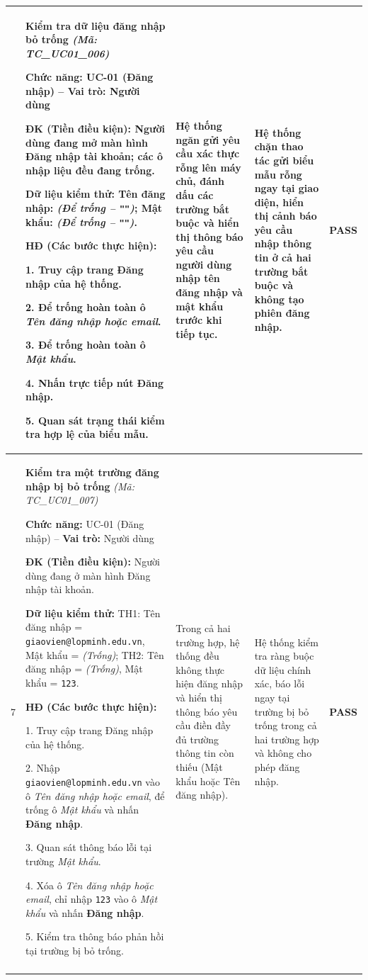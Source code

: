 \documentclass[12pt,a4paper]{report}
\newcommand{\passbadge}{\textbf{\textcolor{passgreen}{PASS}}}
\newcommand{\tcheader}[2]{%
  \textbf{#1} \textit{(Mã: #2)}\par
}
\newcommand{\tcmeta}[2]{%
  \textbf{Chức năng:} #1 -- \textbf{Vai trò:} #2\par
}
\newcommand{\tcpre}[1]{%
  \textbf{ĐK (Tiền điều kiện):} #1\par
}
\newcommand{\tcdata}[1]{%
  \textbf{Dữ liệu kiểm thử:} #1\par
}
\begin{document}
{\begin{longtable}{|C{0.8cm}|L{6.8cm}|L{3.0cm}|L{2.9cm}|C{1.2cm}|}
{%
6 &
\tcheader{Kiểm tra dữ liệu đăng nhập bỏ trống}{TC\_UC01\_006}
\tcmeta{UC-01 (Đăng nhập)}{Người dùng}
\tcpre{Người dùng đang mở màn hình Đăng nhập tài khoản; các ô nhập liệu đều đang trống.}
\tcdata{Tên đăng nhập: \textit{(Để trống -- \texttt{""})}; Mật khẩu: \textit{(Để trống -- \texttt{""})}.}
\textbf{HĐ (Các bước thực hiện):}\par
1. Truy cập trang Đăng nhập của hệ thống.\par
2. Để trống hoàn toàn ô \textit{Tên đăng nhập hoặc email}.\par
3. Để trống hoàn toàn ô \textit{Mật khẩu}.\par
4. Nhấn trực tiếp nút \textbf{Đăng nhập}.\par
5. Quan sát trạng thái kiểm tra hợp lệ của biểu mẫu.
&
Hệ thống ngăn gửi yêu cầu xác thực rỗng lên máy chủ, đánh dấu các trường bắt buộc và hiển thị thông báo yêu cầu người dùng nhập tên đăng nhập và mật khẩu trước khi tiếp tục.
&
Hệ thống chặn thao tác gửi biểu mẫu rỗng ngay tại giao diện, hiển thị cảnh báo yêu cầu nhập thông tin ở cả hai trường bắt buộc và không tạo phiên đăng nhập.
&
\passbadge \\
\hline

7 &
\tcheader{Kiểm tra một trường đăng nhập bị bỏ trống}{TC\_UC01\_007}
\tcmeta{UC-01 (Đăng nhập)}{Người dùng}
\tcpre{Người dùng đang ở màn hình Đăng nhập tài khoản.}
\tcdata{TH1: Tên đăng nhập = \texttt{giaovien@\allowbreak lopminh.edu.vn}, Mật khẩu = \textit{(Trống)}; TH2: Tên đăng nhập = \textit{(Trống)}, Mật khẩu = \texttt{123}.}
\textbf{HĐ (Các bước thực hiện):}\par
1. Truy cập trang Đăng nhập của hệ thống.\par
2. Nhập \texttt{giaovien@\allowbreak lopminh.edu.vn} vào ô \textit{Tên đăng nhập hoặc email}, để trống ô \textit{Mật khẩu} và nhấn \textbf{Đăng nhập}.\par
3. Quan sát thông báo lỗi tại trường \textit{Mật khẩu}.\par
4. Xóa ô \textit{Tên đăng nhập hoặc email}, chỉ nhập \texttt{123} vào ô \textit{Mật khẩu} và nhấn \textbf{Đăng nhập}.\par
5. Kiểm tra thông báo phản hồi tại trường bị bỏ trống.
&
Trong cả hai trường hợp, hệ thống đều không thực hiện đăng nhập và hiển thị thông báo yêu cầu điền đầy đủ trường thông tin còn thiếu (Mật khẩu hoặc Tên đăng nhập).
&
Hệ thống kiểm tra ràng buộc dữ liệu chính xác, báo lỗi ngay tại trường bị bỏ trống trong cả hai trường hợp và không cho phép đăng nhập.
&
\passbadge \\
\hline

}
\end{longtable}}
\end{document}

